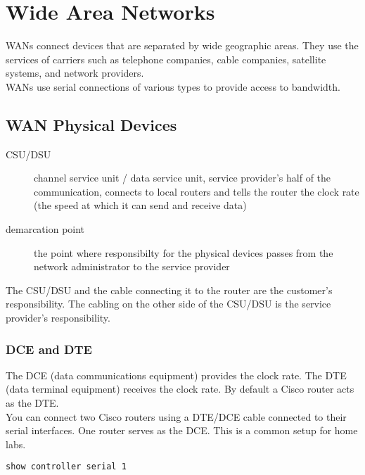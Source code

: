 \section{Wide Area Networks}

WANs connect devices that are separated by wide geographic areas. They use the
services of carriers such as telephone companies, cable companies, satellite
systems, and network providers.\\

WANs use serial connections of various types to provide access to bandwidth.

\subsection{WAN Physical Devices}

\begin{description}

\item[CSU/DSU]
channel service unit / data service unit, service provider's half of the
communication, connects to local routers and tells the router the clock rate
(the speed at which it can send and receive data)

\item[demarcation point]
the point where responsibilty for the physical devices passes from the
network administrator to the service provider
\end{description}

The CSU/DSU and the cable connecting it to the router are the customer's
responsibility. The cabling on the other side of the CSU/DSU is the service
provider's responsibility.

\subsubsection{DCE and DTE}

The DCE (data communications equipment) provides the clock rate. The DTE
(data terminal equipment) receives the clock rate. By default a Cisco
router acts as the DTE.\\

You can connect two Cisco routers using a DTE/DCE cable connected to their
serial interfaces. One router serves as the DCE. This is a common setup
for home labs.\\

\begin{verbatim}
show controller serial 1  
\end{verbatim}

